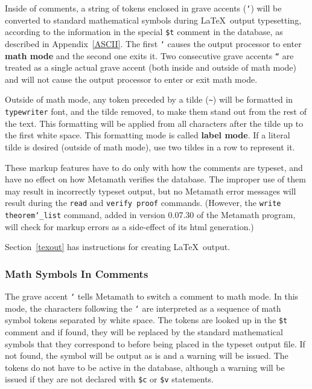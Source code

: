 Inside of comments, a string of tokens enclosed in grave
accents (\texttt{`}) will be converted
to standard mathematical symbols during \LaTeX\ output
typesetting, according to the information in the
special \texttt{\$t} comment in the database, as described in Appendix~\ref{ASCII}.
The first \texttt{`} causes the output processor to enter {\bf math
mode} and the second one exits it.  Two consecutive
grave accents \texttt{``} are treated as a single actual grave accent
(both inside and outside of math mode) and will not cause the output
processor to enter or exit math mode.

Outside of math mode, any token preceded by a tilde (\verb/~/) will be formatted in \texttt{typewriter}
font, and the tilde removed, to make them stand out from the rest of the
text.  This formatting will be applied from all characters after the
tilde up to the first white space.  This formatting
mode is called {\bf label mode}.  If a literal tilde
is desired (outside of math mode), use two tildes in a row to represent
it.

These markup features have to do only with how the comments are typeset,
and have no effect on how Metamath verifies the database.  The improper
use of them may result in incorrectly typeset output, but no Metamath
error messages will result during the \texttt{read} and \texttt{verify
proof} commands.  (However, the \texttt{write
theorem\texttt{\char`\_}list} command, added in version 0.07.30 of the
Metamath program, will check for markup errors as a side-effect of its
{\sc html} generation.)

Section~\ref{texout} has instructions for creating \LaTeX\ output.

\subsubsection{Math Symbols In Comments}

The grave accent \texttt{`} tells
Metamath to switch a comment to math mode.  In this
mode, the characters following the \texttt{`} are interpreted as a
sequence of math symbol tokens separated by white space.  The tokens are looked up in the \texttt{\$t}
comment and if
found, they will be replaced by the standard mathematical symbols that
they correspond to before being placed in the typeset output file.  If
not found, the symbol will be output as is and a warning will be issued.
The tokens do not have to be active in the database, although a warning
will be issued if they are not declared with \texttt{\$c} or
\texttt{\$v} statements.

